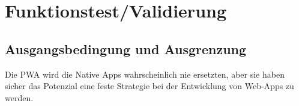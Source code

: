 \chapter{Funktionstest/Validierung}\label{chap:Funktionstest}
\thispagestyle{standard}
\pagestyle{standard}

\section{Ausgangsbedingung und Ausgrenzung}
Die \acs{PWA} wird die Native Apps wahrscheinlich nie ersetzten, aber sie haben sicher das Potenzial eine feste Strategie bei der Entwicklung von \acs{Web-App}s zu werden.



